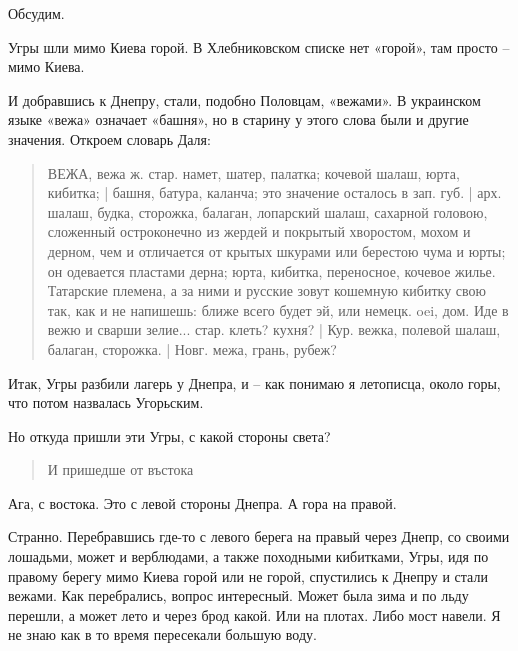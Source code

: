 \documentclass[a5paper,11pt,openany]{article}
\begin{document}
Обсудим.

Угры шли мимо Киева горой. В Хлебниковском списке нет «горой», там просто – мимо Киева.

И добравшись к Днепру, стали, подобно Половцам, «вежами». В украинском языке «вежа» означает «башня», но в старину у этого слова были и другие значения. Откроем словарь Даля:

\begin{quotation}
\noindent ВЕЖА, вежа ж. стар. намет, шатер, палатка; кочевой шалаш, юрта, кибитка; | башня, батура, каланча; это значение осталось в зап. губ. | арх. шалаш, будка, сторожка, балаган, лопарский шалаш, сахарной головою, сложенный остроконечно из жердей и покрытый хворостом, мохом и дерном, чем и отличается от крытых шкурами или берестою чума и юрты; он одевается пластами дерна; юрта, кибитка, переносное, кочевое жилье. Татарские племена, а за ними и русские зовут кошемную кибитку свою так, как и не напишешь: ближе всего будет эй, или немецк. oei, дом. Иде в вежю и сварши зелие... стар. клеть? кухня? | Кур. вежка, полевой шалаш, балаган, сторожка. | Новг. межа, грань, рубеж?
\end{quotation} 



Итак, Угры разбили лагерь у Днепра, и – как понимаю я летописца, около горы, что потом назвалась Угорьским.

Но откуда пришли эти Угры, с какой стороны света?

\begin{quotation}
\noindent И пришедше от въстока
\end{quotation}


Ага, с востока. Это с левой стороны Днепра. А гора на правой.

Странно. Перебравшись где-то с левого берега на правый через Днепр, со своими лошадьми, может и верблюдами, а также походными кибитками, Угры, идя по правому берегу мимо Киева горой или не горой, спустились к Днепру и стали вежами. Как перебрались, вопрос интересный. Может была зима и по льду перешли, а может лето и через брод какой. Или на плотах. Либо мост навели. Я не знаю как в то время пересекали большую воду.

\end{document}
